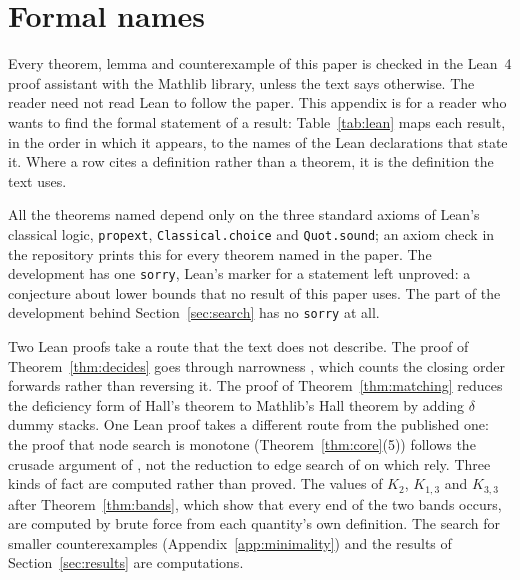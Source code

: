 \section{Formal names}
\label{app:lean}

Every theorem, lemma and counterexample of this paper is checked in the Lean~4
proof assistant with the Mathlib library, unless the text says otherwise. The
reader need not read Lean to follow the paper. This appendix is for a reader
who wants to find the formal statement of a result: Table~\ref{tab:lean} maps
each result, in the order in which it appears, to the names of the Lean
declarations that state it. Where a row cites a definition rather than a
theorem, it is the definition the text uses.

All the theorems named depend only on the three standard axioms of Lean's
classical logic, \texttt{propext}, \texttt{Classical.choice} and
\texttt{Quot.sound}; an axiom check in the repository prints this for every
theorem named in the paper. The development has one \texttt{sorry}, Lean's marker for a statement
left unproved: a conjecture about lower bounds that no result of this paper uses. The part of
the development behind Section~\ref{sec:search} has no \texttt{sorry} at all.

Two Lean proofs take a route that the text does not describe. The proof of
Theorem~\ref{thm:decides} goes through narrowness \citep{LY2002ref11}, which
counts the closing order forwards rather than reversing it. The proof of
Theorem~\ref{thm:matching} reduces the deficiency form of Hall's theorem to
Mathlib's Hall theorem by adding $\delta$ dummy stacks. One Lean proof takes a
different route from the published one: the proof
that node search is monotone (Theorem~\ref{thm:core}(5)) follows the crusade
argument of \citet{BienstockSeymour1991}, not the reduction to edge search of
\citet{LaPaugh1993} on which \citet{LY2002ref10} rely. Three kinds of fact
are computed rather than proved. The values of $K_2$, $K_{1,3}$ and $K_{3,3}$
after Theorem~\ref{thm:bands}, which show that every end of the two bands
occurs, are computed by brute force from each quantity's own definition. The
search for smaller counterexamples (Appendix~\ref{app:minimality}) and the
results of Section~\ref{sec:results} are computations.

